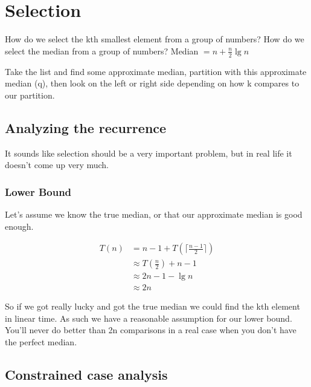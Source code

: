 \documentclass[english, 10pt]{article}
\begin{document}
\section{Selection}

How do we select the kth smallest element from a group of numbers?
How do we select the median from a group of numbers?
Median $= n+\frac{n}{2}\lg n$

\begin{algorithm}
\end{algorithm}

Take the list and find some approximate median, partition with this approximate median (q), then look on the left or right side depending on how k compares to our partition.

\subsection{Analyzing the recurrence}

It sounds like selection should be a very important problem, but in real life it doesn't come up very much.

\subsubsection{Lower Bound}
Let's assume we know the true median, or that our approximate median is good enough.

\begin{align*}
    T(n) &= n - 1 + T\left( \lceil \frac{n-1}{2} \rceil \right) \\
    &\approx T(\frac{n}{2}) + n -1 \\
    &\approx 2n -1 - \lg n \\
    &\approx 2n
\end{align*}

So if we got really lucky and got the true median we could find the kth element
in linear time. As such we have a reasonable assumption for our lower bound.
You'll never do better than 2n comparisons in a real case when you don't have
the perfect median.

\subsection{Constrained case analysis}
\end{document}
